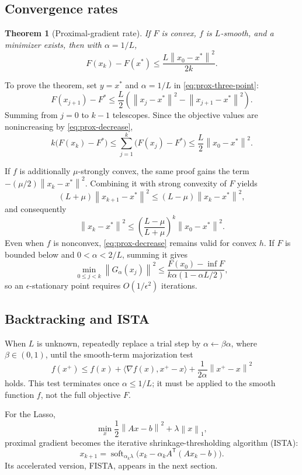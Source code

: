 \documentclass[12pt,oneside]{book}
\numberwithin{equation}{section}
\theoremstyle{definition}
\theoremstyle{plain}
\newtheorem{theorem}{Theorem}[section]
\theoremstyle{remark}
\newcommand{\norm}[1]{\left\lVert #1 \right\rVert}
\begin{document}
\subsection{Convergence rates}

\begin{theorem}[Proximal-gradient rate]
If $F$ is convex, $f$ is $L$-smooth, and a minimizer exists, then with
$\alpha=1/L$,
\[
    F(x_k)-F(x^*)\leq\frac{L\norm{x_0-x^*}^2}{2k}.
\]
\end{theorem}
To prove the theorem, set $y=x^*$ and $\alpha=1/L$ in
\eqref{eq:prox-three-point}:
\[
 F(x_{j+1})-F^*\leq\frac L2
 \left(\norm{x_j-x^*}^2-\norm{x_{j+1}-x^*}^2\right).
\]
Summing from $j=0$ to $k-1$ telescopes. Since the objective values are
nonincreasing by \eqref{eq:prox-decrease},
\[
 k\bigl(F(x_k)-F^*\bigr)
 \leq\sum_{j=1}^k\bigl(F(x_j)-F^*\bigr)
 \leq\frac L2\norm{x_0-x^*}^2.
\]

If $f$ is additionally $\mu$-strongly convex, the same proof gains the term
$-(\mu/2)\norm{x_k-x^*}^2$. Combining it with strong convexity of $F$ yields
\[
 (L+\mu)\norm{x_{k+1}-x^*}^2
 \leq(L-\mu)\norm{x_k-x^*}^2,
\]
and consequently
\[
 \norm{x_k-x^*}^2
 \leq\left(\frac{L-\mu}{L+\mu}\right)^k\norm{x_0-x^*}^2.
\]
Even when $f$ is nonconvex, \eqref{eq:prox-decrease} remains valid for convex
$h$. If $F$ is bounded below and $0<\alpha<2/L$, summing it gives
\[
 \min_{0\leq j<k}\norm{G_\alpha(x_j)}^2
 \leq\frac{F(x_0)-\inf F}{k\alpha(1-\alpha L/2)},
\]
so an $\epsilon$-stationary point requires $O(1/\epsilon^2)$ iterations.

\subsection{Backtracking and ISTA}

When $L$ is unknown, repeatedly replace a trial step by
$\alpha\leftarrow\beta\alpha$, where $\beta\in(0,1)$, until the smooth-term
majorization test
\[
 f(x^+)\leq f(x)+\langle\nabla f(x),x^+-x\rangle
       +\frac1{2\alpha}\norm{x^+-x}^2
\]
holds. This test terminates once $\alpha\leq1/L$; it must be applied to the
smooth function $f$, not the full objective $F$.

For the Lasso,
\[
 \min_x\frac12\norm{Ax-b}^2+\lambda\norm{x}_1,
\]
proximal gradient becomes the iterative shrinkage-thresholding algorithm
(ISTA):
\[
 x_{k+1}=\operatorname{soft}_{\alpha_k\lambda}
 \bigl(x_k-\alpha_kA^\mathsf T(Ax_k-b)\bigr).
\]
Its accelerated version, FISTA, appears in the next section.
\end{document}

